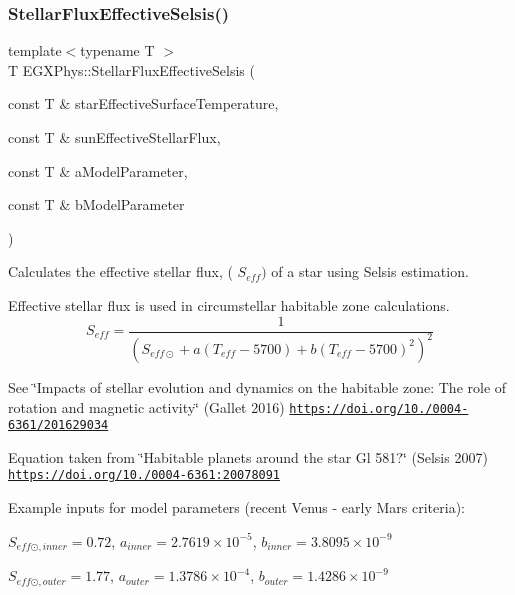 \subsubsection{\texorpdfstring{Stellar\+Flux\+Effective\+Selsis()}{StellarFluxEffectiveSelsis()}}
{\footnotesize\ttfamily template$<$typename T $>$ \\
T E\+G\+X\+Phys\+::\+Stellar\+Flux\+Effective\+Selsis (\begin{DoxyParamCaption}\item[{const T \&}]{star\+Effective\+Surface\+Temperature,  }\item[{const T \&}]{sun\+Effective\+Stellar\+Flux,  }\item[{const T \&}]{a\+Model\+Parameter,  }\item[{const T \&}]{b\+Model\+Parameter }\end{DoxyParamCaption})}



Calculates the effective stellar flux, ( $S_{eff})$ of a star using Selsis estimation. 

Effective stellar flux is used in circumstellar habitable zone calculations. \[S_{eff}= \frac{1}{(S_{eff\odot}+a(T_{eff}-5700)+b(T_{eff}-5700)^2)^2}\]

See \char`\"{}\+Impacts of stellar evolution and dynamics on the habitable zone\+: The role of rotation and magnetic activity\char`\"{} (Gallet 2016) \href{https://doi.org/10.1051/0004-6361/201629034}{\tt https\+://doi.\+org/10./0004-\/6361/201629034}

Equation taken from \char`\"{}\+Habitable planets around the star Gl 581?\char`\"{} (Selsis 2007) \href{https://doi.org/10.1051/0004-6361:20078091}{\tt https\+://doi.\+org/10./0004-\/6361\+:20078091}

Example inputs for model parameters (recent Venus -\/ early Mars criteria)\+:

$S_{eff\odot,inner} = 0.72$, $a_{inner} = 2.7619 \times 10^{-5}$, $b_{inner} = 3.8095 \times 10^{-9}$

$S_{eff\odot,outer} = 1.77$, $a_{outer} = 1.3786 \times 10^{-4}$, $b_{outer} = 1.4286 \times 10^{-9}$


